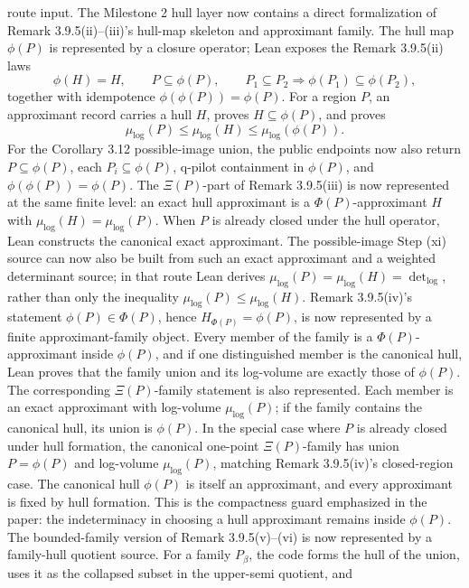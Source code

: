 \documentclass[11pt]{article}
\newcommand{\Lean}{Lean}
\theoremstyle{plain}
\theoremstyle{definition}
\theoremstyle{remark}
\begin{document}
route input.
The Milestone 2 hull layer now contains a direct formalization of
Remark 3.9.5(ii)--(iii)'s hull-map skeleton and approximant family.  The hull
map \(\phi(P)\) is represented by a closure operator; \Lean{} exposes the
Remark 3.9.5(ii) laws
\[
  \phi(H)=H,\qquad P\subseteq\phi(P),\qquad
  P_1\subseteq P_2\Rightarrow \phi(P_1)\subseteq\phi(P_2),
\]
together with idempotence \(\phi(\phi(P))=\phi(P)\).  For a region \(P\), an
approximant record carries a hull \(H\), proves \(H\subseteq\phi(P)\), and proves
\[
  \mu_{\log}(P)\le \mu_{\log}(H)\le \mu_{\log}(\phi(P)).
\]
For the Corollary 3.12 possible-image union, the public endpoints now also
return \(P\subseteq\phi(P)\), each \(P_i\subseteq\phi(P)\), q-pilot
containment in \(\phi(P)\), and \(\phi(\phi(P))=\phi(P)\).
The \(\Xi(P)\)-part of Remark 3.9.5(iii) is now represented at the same
finite level: an exact hull approximant is a \(\Phi(P)\)-approximant \(H\)
with \(\mu_{\log}(H)=\mu_{\log}(P)\).  When \(P\) is already closed under
the hull operator, \Lean{} constructs the canonical exact approximant.
The possible-image Step (xi) source can now also be built from such an exact
approximant and a weighted determinant source; in that route \Lean{} derives
\(\mu_{\log}(P)=\mu_{\log}(H)=\det_{\log}\), rather than only the inequality
\(\mu_{\log}(P)\le\mu_{\log}(H)\).
Remark 3.9.5(iv)'s statement \(\phi(P)\in\Phi(P)\), hence
\(H_{\Phi(P)}=\phi(P)\), is now represented by a finite approximant-family
object.  Every member of the family is a \(\Phi(P)\)-approximant inside
\(\phi(P)\), and if one distinguished member is the canonical hull, \Lean{}
proves that the family union and its log-volume are exactly those of
\(\phi(P)\).
The corresponding \(\Xi(P)\)-family statement is also represented.  Each
member is an exact approximant with log-volume \(\mu_{\log}(P)\); if the
family contains the canonical hull, its union is \(\phi(P)\).  In the special
case where \(P\) is already closed under hull formation, the canonical
one-point \(\Xi(P)\)-family has union \(P=\phi(P)\) and log-volume
\(\mu_{\log}(P)\), matching Remark 3.9.5(iv)'s closed-region case.
The canonical hull \(\phi(P)\) is itself an approximant, and every approximant
is fixed by hull formation.  This is the compactness guard emphasized in the
paper: the indeterminacy in choosing a hull approximant remains inside
\(\phi(P)\).
The bounded-family version of Remark 3.9.5(v)--(vi) is now represented by a
family-hull quotient source.  For a family \(P_\beta\), the code forms the hull
of the union, uses it as the collapsed subset in the upper-semi quotient, and
\end{document}
